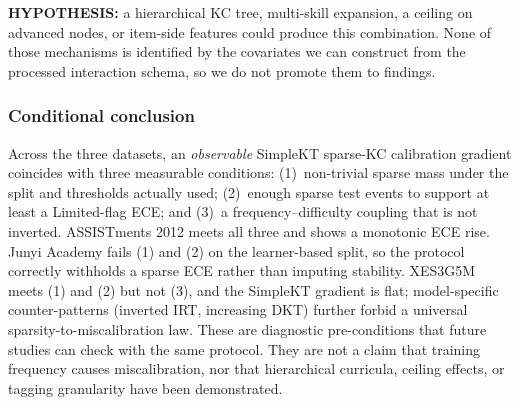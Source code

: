 \textbf{HYPOTHESIS:} a hierarchical KC tree, multi-skill expansion, a ceiling on advanced nodes, or item-side features could produce this combination.
None of those mechanisms is identified by the covariates we can construct from the processed interaction schema, so we do not promote them to findings.

\subsubsection*{Conditional conclusion}
Across the three datasets, an \emph{observable} SimpleKT sparse-KC calibration gradient coincides with three measurable conditions: (1)~non-trivial sparse mass under the split and thresholds actually used; (2)~enough sparse test events to support at least a Limited-flag ECE; and (3)~a frequency--difficulty coupling that is not inverted.
ASSISTments 2012 meets all three and shows a monotonic ECE rise.
Junyi Academy fails (1) and (2) on the learner-based split, so the protocol correctly withholds a sparse ECE rather than imputing stability.
XES3G5M meets (1) and (2) but not (3), and the SimpleKT gradient is flat; model-specific counter-patterns (inverted IRT, increasing DKT) further forbid a universal sparsity-to-miscalibration law.
These are diagnostic pre-conditions that future studies can check with the same protocol.
They are not a claim that training frequency causes miscalibration, nor that hierarchical curricula, ceiling effects, or tagging granularity have been demonstrated.
